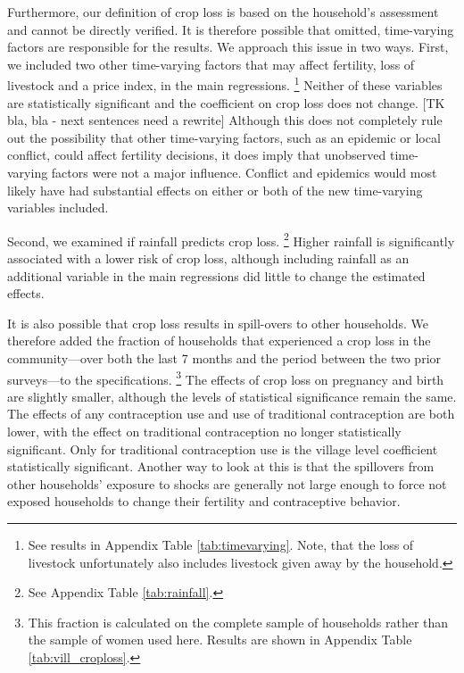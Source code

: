 \documentclass[letterpaper,12pt]{article}
\begin{document}
Furthermore, our definition of crop loss is based on the 
household's assessment and cannot be directly verified.
It is therefore possible that omitted, time-varying 
factors are responsible for the results. 
We approach this issue in two ways.
First, we included two other time-varying factors that
may affect fertility, loss of livestock and a price
index, in the main regressions.%
\footnote{
See results in Appendix Table \ref{tab:timevarying}.
Note, that the loss of livestock unfortunately also
includes livestock given away by the household.
}
Neither of these variables are statistically significant
and the coefficient on crop loss does not change.
[TK bla, bla - next sentences need a rewrite]
Although this does not completely rule out the possibility
that other time-varying factors, such as an epidemic or
local conflict, could affect fertility decisions, it does
imply that unobserved time-varying factors were not a 
major influence.
Conflict and epidemics would most likely have had 
substantial effects on either or both of the new
time-varying variables included.

Second, we examined if rainfall predicts crop loss.%
\footnote{
See Appendix Table \ref{tab:rainfall}.
}
Higher rainfall is significantly associated with a 
lower risk of crop loss,
although including rainfall as an additional
variable in the main regressions did little to
change the estimated effects.


It is also possible that crop loss results in spill-overs to other
households.
We therefore added the fraction of households that experienced a crop
loss in the community---over both the last 7 months and the period 
between the two prior surveys---to the specifications.%
\footnote{
This fraction is calculated on the complete sample of households
rather than the sample of women used here.
Results are shown in Appendix Table \ref{tab:vill_croploss}.
}
The effects of crop loss on pregnancy and birth are slightly smaller,
although the levels of statistical significance remain the same.
The effects of any contraception use and use of traditional
contraception are both lower, with the effect on traditional
contraception no longer statistically significant.
Only for traditional contraception use is the village level 
coefficient statistically significant.
Another way to look at this is that the spillovers from other
households' exposure to shocks are generally not large enough to 
force not exposed households to change their fertility and 
contraceptive behavior.
\end{document}

